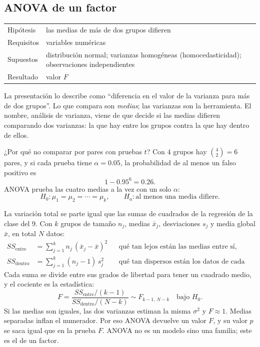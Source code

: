 \documentclass[11pt,letterpaper]{article}
\begin{document}

\subsection*{ANOVA de un factor}

\begin{center}
\small
\begin{tabular}{l>{\raggedright\arraybackslash}p{10.5cm}}
    \toprule
    Hipótesis & las medias de más de dos grupos difieren \\
    Requisitos & variables numéricas \\
    Supuestos & distribución normal; varianzas homogéneas
                (homocedasticidad); observaciones independientes \\
    Resultado & valor $F$ \\
    \bottomrule
\end{tabular}
\end{center}

\begin{ojo}
    La presentación lo describe como ``diferencia en el valor de la
    varianza para más de dos grupos''. Lo que compara son
    \emph{medias}; las varianzas son la herramienta. El nombre, análisis
    de varianza, viene de que decide si las medias difieren comparando
    dos varianzas: la que hay entre los grupos contra la que hay dentro
    de ellos.
\end{ojo}

¿Por qué no comparar por pares con pruebas $t$? Con $4$ grupos hay
$\binom{4}{2} = 6$ pares, y si cada prueba tiene $\alpha = 0.05$, la
probabilidad de al menos un falso positivo es
\[
    1 - 0.95^6 = 0.26 .
\]
ANOVA prueba las cuatro medias a la vez con un solo $\alpha$:
\[
    H_0\colon \mu_1 = \mu_2 = \cdots = \mu_k ,
    \qquad
    H_a\colon \text{al menos una media difiere} .
\]

La variación total se parte igual que las sumas de cuadrados de la
regresión de la clase del $9$. Con $k$ grupos de tamaño $n_j$, medias
$\bar{x}_j$, desviaciones $s_j$ y media global $\bar{x}$, en total $N$
datos:
\begin{align*}
    SS_{\text{entre}} &= \sum_{j=1}^{k} n_j\, (\bar{x}_j - \bar{x})^2
    && \text{qué tan lejos están las medias entre sí,} \\
    SS_{\text{dentro}} &= \sum_{j=1}^{k} (n_j - 1)\, s_j^2
    && \text{qué tan dispersos están los datos de cada grupo.}
\end{align*}
Cada suma se divide entre sus grados de libertad para tener un
cuadrado medio, y el cociente es la estadística:
\[
    F = \frac{SS_{\text{entre}} / (k - 1)}
             {SS_{\text{dentro}} / (N - k)}
      \sim F_{k - 1,\, N - k} \quad \text{bajo } H_0 .
\]
Si las medias son iguales, las dos varianzas estiman la misma
$\sigma^2$ y $F \approx 1$. Medias separadas inflan el numerador. Por
eso ANOVA devuelve un valor $F$, y su valor $p$ se saca igual que en
la prueba $F$. ANOVA no es un modelo sino una familia; este es el de
un factor.
\end{document}
